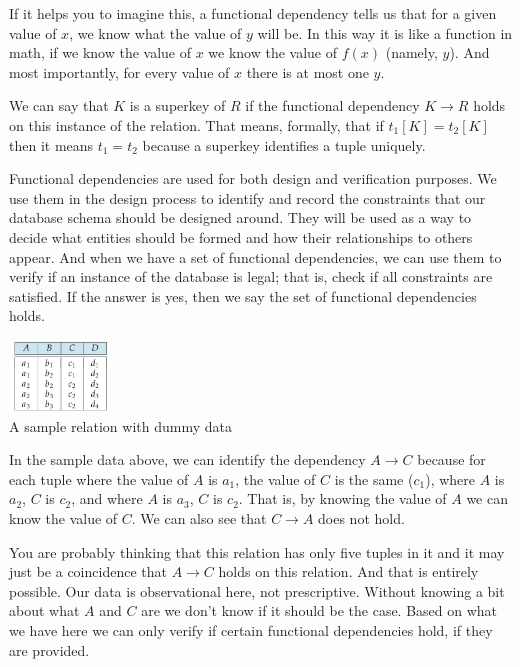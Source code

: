 If it helps you to imagine this, a functional dependency tells us that for a given value of $x$, we know what the value of $y$ will be. In this way it is like a function in math, if we know the value of $x$ we know the value of $f(x)$ (namely, $y$). And most importantly, for every value of $x$ there is at most one $y$. 

We can say that $K$ is a superkey of $R$ if the functional dependency $K \rightarrow R$ holds on this instance of the relation. That means, formally, that if $t_{1}[K] = t_{2}[K]$ then it means $t_{1} = t_{2}$ because a superkey identifies a tuple uniquely.

Functional dependencies are used for both design and verification purposes. We use them in the design process to identify and record the constraints that our database schema should be designed around. They will be used as a way to decide what entities should be formed and how their relationships to others appear. And when we have a set of functional dependencies, we can use them to verify if an instance of the database is legal; that is, check if all constraints are satisfied. If the answer is yes, then we say the set of functional dependencies holds.
 
\begin{center}
\includegraphics[width=0.2\textwidth]{images/fd-1}\\
A sample relation with dummy data~\cite{dsc}
\end{center}

In the sample data above, we can identify the dependency $A \rightarrow C$ because for each tuple where the value of $A$ is $a_{1}$, the value of $C$ is the same ($c_{1}$), where $A$ is $a_{2}$, $C$ is $c_{2}$, and where $A$ is $a_{3}$, $C$ is $c_{2}$. That is, by knowing the value of $A$ we can know the value of $C$. We can also see that $C \rightarrow A$ does not hold.

You are probably thinking that this relation has only five tuples in it and it may just be a coincidence that $A \rightarrow C$ holds on this relation. And that is entirely possible. Our data is observational here, not prescriptive. Without knowing a bit about what $A$ and $C$ are we don't know if it should be the case. Based on what we have here we can only verify if certain functional dependencies hold, if they are provided. 

